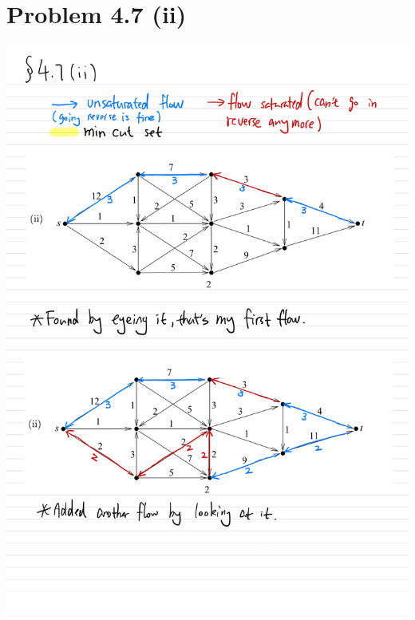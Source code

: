 \documentclass[]{article}
\theoremstyle{definition}
\begin{document}
\section{Problem 4.7 (ii)}
    \includegraphics[width=16cm]{HW6-7.jpg}
    \\
\end{document}
